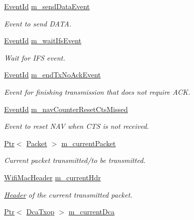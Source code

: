 \begin{DoxyCompactItemize}
\hyperlink{classns3_1_1EventId}{Event\+Id} \hyperlink{classns3_1_1MacLow_a3f6b0135f1179dd4cd5d2002f7355423}{m\+\_\+send\+Data\+Event}
\begin{DoxyCompactList}\small\item\em Event to send D\+A\+TA. \end{DoxyCompactList}\item 
\hyperlink{classns3_1_1EventId}{Event\+Id} \hyperlink{classns3_1_1MacLow_abdfe679a569b3b5b3262b08ccc8f5df8}{m\+\_\+wait\+Ifs\+Event}
\begin{DoxyCompactList}\small\item\em Wait for I\+FS event. \end{DoxyCompactList}\item 
\hyperlink{classns3_1_1EventId}{Event\+Id} \hyperlink{classns3_1_1MacLow_a25990734c06d4df0d75276f52e103f8a}{m\+\_\+end\+Tx\+No\+Ack\+Event}
\begin{DoxyCompactList}\small\item\em Event for finishing transmission that does not require A\+CK. \end{DoxyCompactList}\item 
\hyperlink{classns3_1_1EventId}{Event\+Id} \hyperlink{classns3_1_1MacLow_a5aef4547e2a6ddad9c85d55bf77e43b1}{m\+\_\+nav\+Counter\+Reset\+Cts\+Missed}
\begin{DoxyCompactList}\small\item\em Event to reset N\+AV when C\+TS is not received. \end{DoxyCompactList}\item 
\hyperlink{classns3_1_1Ptr}{Ptr}$<$ \hyperlink{classns3_1_1Packet}{Packet} $>$ \hyperlink{classns3_1_1MacLow_aa4f81bb523ceed1bbf5a84851b25e29c}{m\+\_\+current\+Packet}
\begin{DoxyCompactList}\small\item\em Current packet transmitted/to be transmitted. \end{DoxyCompactList}\item 
\hyperlink{classns3_1_1WifiMacHeader}{Wifi\+Mac\+Header} \hyperlink{classns3_1_1MacLow_aec9902bc8026338baf261d2de8fcd83b}{m\+\_\+current\+Hdr}
\begin{DoxyCompactList}\small\item\em \hyperlink{classns3_1_1Header}{Header} of the current transmitted packet. \end{DoxyCompactList}\item 
\hyperlink{classns3_1_1Ptr}{Ptr}$<$ \hyperlink{classns3_1_1DcaTxop}{Dca\+Txop} $>$ \hyperlink{classns3_1_1MacLow_a18945fbeea3c48c6bb8abd2d46429eeb}{m\+\_\+current\+Dca}

\end{DoxyCompactItemize}
